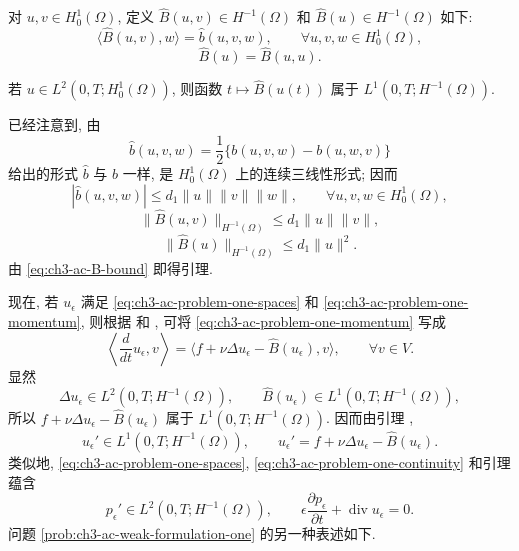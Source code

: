 \hypertarget{chapter-03-page-305}{}
对 $u,v\in H_0^1(\Omega)$, 定义 $\widehat B(u,v)\in H^{-1}(\Omega)$ 和 $\widehat B(u)\in H^{-1}(\Omega)$ 如下:
\begin{equation}
\langle\widehat B(u,v),w\rangle=\widehat b(u,v,w),
\qquad\forall u,v,w\in H_0^1(\Omega),
\label{eq:ch3-ac-B-bilinear-definition}
\end{equation}
\begin{equation}
\widehat B(u)=\widehat B(u,u).
\label{eq:ch3-ac-B-quadratic-definition}
\end{equation}

\begin{Lemma}
\label{lem:ch3-ac-B-time-integrability}
若 $u\in L^2(0,T;H_0^1(\Omega))$, 则函数 $t\mapsto\widehat B(u(t))$ 属于 $L^1(0,T;H^{-1}(\Omega))$.
\end{Lemma}

\begin{Proof}
已经注意到, 由
\begin{equation}
\widehat b(u,v,w)=\frac12\{b(u,v,w)-b(u,w,v)\}
\label{eq:ch3-ac-bhat-definition}
\end{equation}
给出的形式 $\widehat b$ 与 $b$ 一样, 是 $H_0^1(\Omega)$ 上的连续三线性形式; 因而
\[
|\widehat b(u,v,w)|\leq d_1\lVert u\rVert\lVert v\rVert\lVert w\rVert,
\qquad\forall u,v,w\in H_0^1(\Omega),
\]
\[
\lVert\widehat B(u,v)\rVert_{H^{-1}(\Omega)}
\leq d_1\lVert u\rVert\lVert v\rVert,
\]
\begin{equation}
\lVert\widehat B(u)\rVert_{H^{-1}(\Omega)}
\leq d_1\lVert u\rVert^2.
\label{eq:ch3-ac-B-bound}
\end{equation}
由 \eqref{eq:ch3-ac-B-bound} 即得引理.
\end{Proof}

现在, 若 $u_\epsilon$ 满足 \eqref{eq:ch3-ac-problem-one-spaces} 和 \eqref{eq:ch3-ac-problem-one-momentum}, 则根据  和 , 可将 \eqref{eq:ch3-ac-problem-one-momentum} 写成
\[
\left\langle\frac d{dt}u_\epsilon,v\right\rangle
=\langle f+\nu\Delta u_\epsilon-\widehat B(u_\epsilon),v\rangle,
\qquad\forall v\in V.
\]
显然
\[
\Delta u_\epsilon\in L^2(0,T;H^{-1}(\Omega)),
\qquad
\widehat B(u_\epsilon)\in L^1(0,T;H^{-1}(\Omega)),
\]
所以 $f+\nu\Delta u_\epsilon-\widehat B(u_\epsilon)$ 属于 $L^1(0,T;H^{-1}(\Omega))$. 因而由引理 ,
\begin{equation}
u_\epsilon'\in L^1(0,T;H^{-1}(\Omega)),
\qquad u_\epsilon'=f+\nu\Delta u_\epsilon-\widehat B(u_\epsilon).
\label{eq:ch3-ac-velocity-time-derivative}
\end{equation}
类似地, \eqref{eq:ch3-ac-problem-one-spaces}, \eqref{eq:ch3-ac-problem-one-continuity} 和引理  蕴含
\begin{equation}
p_\epsilon'\in L^2(0,T;H^{-1}(\Omega)),
\qquad \epsilon\frac{\partial p_\epsilon}{\partial t}
+\operatorname{div}u_\epsilon=0.
\label{eq:ch3-ac-pressure-time-derivative}
\end{equation}
问题 \ref{prob:ch3-ac-weak-formulation-one} 的另一种表述如下.


